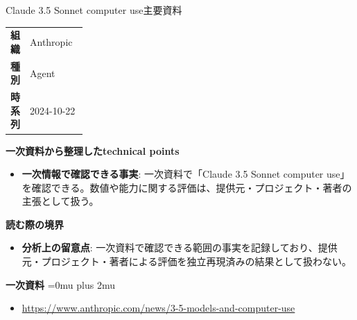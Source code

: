 \begin{technicalnote}{Claude 3.5 Sonnet computer use}{主要資料}
\begingroup
\begin{tabularx}{\linewidth}{@{}>{\bfseries}p{0.22\linewidth}X@{}}
組織 & Anthropic \\
種別 & Agent \\
時系列 & 2024-10-22 \\
\end{tabularx}
\smallskip
{\bfseries 一次資料から整理したtechnical points}
\begin{itemize}[leftmargin=1.5em,itemsep=0.35em]
\item \textbf{一次情報で確認できる事実}: 一次資料で「Claude 3.5 Sonnet computer use」を確認できる。数値や能力に関する評価は、提供元・プロジェクト・著者の主張として扱う。
\end{itemize}
\begin{minipage}{\linewidth}
{\bfseries 読む際の境界}
\begin{itemize}[leftmargin=1.5em,itemsep=0.35em]
\item \textbf{分析上の留意点}: 一次資料で確認できる範囲の事実を記録しており、提供元・プロジェクト・著者による評価を独立再現済みの結果として扱わない。
\end{itemize}
\begin{samepage}
{\bfseries 一次資料}
\begingroup\sloppy
\Urlmuskip=0mu plus 2mu\relax
\begin{itemize}[leftmargin=1.5em,itemsep=0.25em]
\item {\scriptsize\url{https://www.anthropic.com/news/3-5-models-and-computer-use}}
\end{itemize}
\endgroup
\end{samepage}
\end{minipage}
\endgroup
\end{technicalnote}
\medskip

